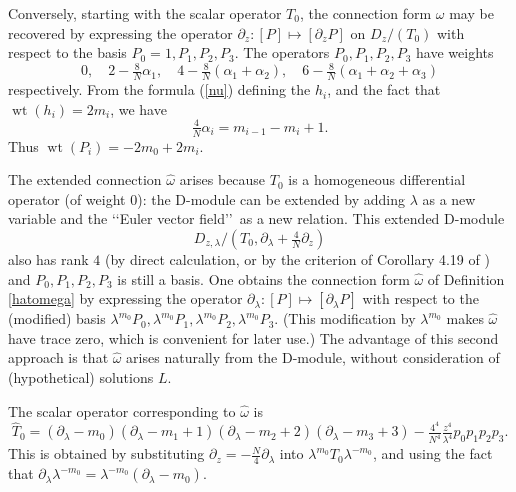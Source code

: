 \documentclass[a4paper,12pt,leqno]{amsart}
\numberwithin{equation}{section}
\theoremstyle{plain}
\theoremstyle{definition}
\newcommand{\al}{\alpha}
\newcommand{\la}{\lambda}
\newcommand{\om}{\omega}
\DeclareMathOperator{\wt}{wt}
\renewcommand{\ll}{\lq\lq}
\newcommand{\rr}{\rq\rq\ }
\renewcommand{\b}{\partial}
\newcommand{\bla}{\b_\la}
\newcommand{\bz}{\b_z}
\newcommand{\nn}{m}
\begin{document}
Conversely, starting with the scalar operator $T_0$, the connection form $\om$ may be recovered  by expressing the operator $\bz:[P]\mapsto[\bz P]$ on $D_z/(T_0)$ with respect to the basis
$P_0=1, P_1, P_2, P_3$.
The operators $P_0,P_1,P_2,P_3$ have weights 
\[
0, \quad 2-\tfrac 8N \al_1, \quad 4-\tfrac 8N (\al_1+\al_2), \quad 6-\tfrac 8N (\al_1+\al_2+\al_3)
\]
respectively. From the formula (\ref{nu}) defining the $h_i$, and the fact that $\wt(h_i) = 2\nn_i$, we have
\begin{equation}\label{alphaiandni}
\tfrac 4N\al_i=\nn_{i-1}-\nn_i+1.
\end{equation}
Thus $\wt(P_i)=-2\nn_0+2\nn_i$.

The extended connection $\hat\om$ arises because $T_0$ is a homogeneous differential operator (of weight $0$): the D-module can be extended by adding $\la$ as a new variable and the \ll Euler vector field\rr as a new relation.  This extended D-module
 \[
 D_{z,\la}/(T_0,\bla+\tfrac4N\bz)
 \]
 also has rank $4$ (by direct calculation, or by the criterion of Corollary 4.19 of \cite{Gu08}) and
 $P_0,P_1,P_2,P_3$ is still a basis.  One obtains the connection form $\hat\om$ of Definition \ref{hatomega}
 by expressing the operator $\bla:[P]\mapsto[\bla P]$ with respect to the (modified) basis 
 $\la^{\nn_0}P_0, \la^{\nn_0}P_1, \la^{\nn_0}P_2, \la^{\nn_0}P_3$. (This modification by 
 $\la^{\nn_0}$ makes $\hat\om$ have trace zero, which is convenient for later use.) The advantage of this second approach is that $\hat\om$ arises naturally from the D-module, without consideration of (hypothetical) solutions $L$.

The scalar operator corresponding to $\hat\om$ is 
\[
\hat T_0=
(\bla-\nn_0)(\bla-\nn_1+1)(\bla-\nn_2+2)(\bla-\nn_3+3)
- \tfrac{4^4}{N^4} \tfrac{z^4}{\la^4} p_0p_1p_2p_3.
\]
This is obtained by substituting $\bz=-\tfrac N4 \bla$ into $\la^{\nn_0} T_0 \la^{-\nn_0}$, and using the fact that $\bla \la^{-\nn_0}= \la^{-\nn_0}(\bla-\nn_0)$. 
\end{document}
